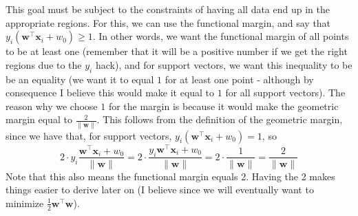 \documentclass[12pt]{article}
\newcommand{\x}{\cdot}
\newcommand{\norm}[1]{\lVert#1\rVert}
\begin{document}
This goal must be subject to the constraints of having all data end up in the appropriate regions. For this, we can use the functional margin, and say that $y_i(\mathbf{w}^\top\mathbf{x}_i + w_0) \geq 1$. In other words, we want the functional margin of all points to be at least one (remember that it will be a positive number if we get the right regions due to the $y_i$ hack), and for support vectors, we want this inequality to be be an equality (we want it to equal $1$ for at least one point - although by consequence I believe this would make it equal to $1$ for all support vectors). The reason why we choose $1$ for the margin is because it would make the geometric margin equal to $\frac{2}{\norm{\mathbf{w}}}$. This follows from the definition of the geometric margin, since we have that, for support vectors, $y_i(\mathbf{w}^\top\mathbf{x}_i + w_0) = 1$, so
\[
	2 \x y_i\frac{\mathbf{w}^\top\mathbf{x}_i + w_0}{\norm{\mathbf{w}}} = 2 \x \frac{y_i\mathbf{w}^\top\mathbf{x}_i + w_0}{\norm{\mathbf{w}}} = 2 \x \frac{1}{\norm{\mathbf{w}}} = \frac{2}{\norm{\mathbf{w}}}
\]
Note that this also means the functional margin equals 2. Having the 2 makes things easier to derive later on (I believe since we will eventually want to minimize $\frac{1}{2}\mathbf{w}^\top\mathbf{w}$).
\end{document}
